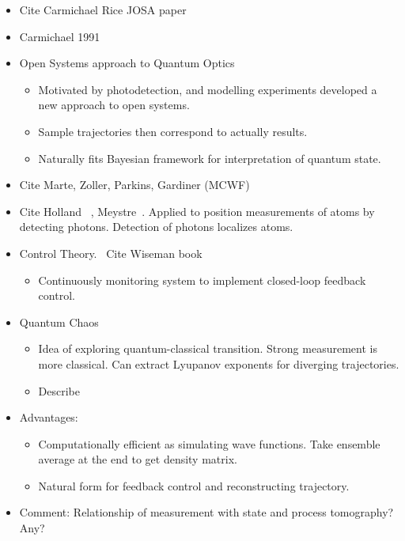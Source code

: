 \begin{itemize}
\item Cite Carmichael Rice JOSA paper~\cite{Carmichael1989}
\item Carmichael 1991 ~\cite{Carmichael1991}
\item Open Systems approach to Quantum Optics\cite{Carmichael1993}
\begin{itemize}
\item Motivated by photodetection, and modelling experiments developed a new approach to open systems.  
\item Sample trajectories then correspond to actually results.
\item Naturally fits Bayesian framework for interpretation of quantum state.  
\end{itemize}
\item Cite Marte, Zoller, Parkins, Gardiner (MCWF)  \cite{Dalibard1992,Dum1992,Gardiner1992}

\item Cite Holland ~\cite{Holland1996}, Meystre~\cite{Greenwood1997}.
  Applied to position measurements of atoms by detecting photons.
  Detection of photons localizes atoms.  
\item Control Theory.~\cite{Wiseman1993}  Cite Wiseman book
\begin{itemize}
  \item Continuously monitoring system to implement closed-loop feedback control.  
\end{itemize}
\item Quantum Chaos
\begin{itemize}
  \item Idea of exploring quantum-classical transition.
  Strong measurement is more classical.
  Can extract Lyupanov exponents for diverging trajectories.
  \cite{Bhattacharya2000,Habib2002,Habib2006}
  \cite{Scott2001}
  \item Describe 
\end{itemize}
\item Advantages:
\begin{itemize}
  \item Computationally efficient as simulating wave functions.
  Take ensemble average at the end to get density matrix.  
  \item Natural form for feedback control and reconstructing trajectory.  
\end{itemize}
\item Comment: Relationship of measurement with state and process tomography?  Any?  


\end{itemize}
